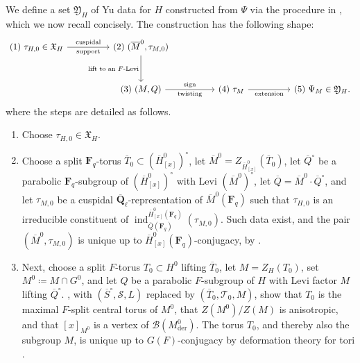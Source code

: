 \documentclass[reqno]{amsart}
\numberwithin{equation}{subsection}
\newcommand{\F}{\mathbf{F}}
\newcommand{\Q}{\mathbf{Q}}
\newcommand{\ol}[1]{\overline{#1}}
\newcommand\cB{\mathcal{B}}
\newcommand\cS{\mathcal{S}}
\newcommand\cT{\mathcal{T}}
\DeclareMathOperator{\ind}{ind}
\DeclareMathOperator{\der}{der}
\theoremstyle{remark}
\numberwithin{equation}{subsection}
\numberwithin{figure}{subsection}
\begin{document}
We define a set $\mathfrak Y_H$ of Yu data for $H$ constructed from $\Psi$ via the procedure in \cite[\S 9]{CF26a}, which we now recall concisely.
The construction has the following shape:
\[
\begin{tikzcd}[column sep=4.8em, row sep=3em]
\text{(1) }\tau_{H,0}\in\mathfrak X_H
\ar[r, "\text{cuspidal}", "\text{support}"'] &
\text{(2) }(\ol M^0,\tau_{M,0})
\ar[d, "\text{lift to an }F\text{-Levi}"'] \\
&
\text{(3) }(M,Q)
\ar[r, "\text{sign}", "\text{twisting}"'] &
\text{(4) }\tau_M
\ar[r, "\text{extension}"'] &
\text{(5) }\Psi_M\in\mathfrak Y_H .
\end{tikzcd}
\]
where the steps are detailed as follows.
\begin{enumerate}
\item Choose $\tau_{H,0} \in \mathfrak X_H$.
\item Choose a split $\F_q$-torus $\ol T_0 \subset (\ol H^0_{[x]})^\circ$, let $\ol M^0 = Z_{\ol H^0_{[x]}}(\ol T_0)$, let $\ol Q^\circ$ be a parabolic $\F_q$-subgroup of $(\ol H^0_{[x]})^\circ$ with Levi $(\ol M^0)^\circ$, let $\ol Q = \ol M^0 \cdot \ol Q^\circ$, and let $\tau_{M,0}$ be a cuspidal $\ol\Q_\ell$-representation of $\ol M^0(\F_q)$ such that $\tau_{H,0}$ is an irreducible constituent of $\ind_{\ol Q(\F_q)}^{\ol H^0_{[x]}(\F_q)}(\tau_{M,0})$. Such data exist, and the pair $(\ol M^0, \tau_{M,0})$ is unique up to $\ol H^0_{[x]}(\F_q)$-conjugacy, by \cite[Lemma~2.10.2]{Cot26b}.
\item Next, choose a split $F$-torus $T_0 \subset H^0$ lifting $\ol T_0$, let $M = Z_H(T_0)$, set $M^0\coloneqq M\cap G^0$, and let $Q$ be a parabolic $F$-subgroup of $H$ with Levi factor $M$ lifting $\ol Q^\circ$. \cite[Lemmas~9.1.1 and 9.1.2]{CF26a}, with $(\ol S^\circ,\cS,L)$ replaced by $(\ol T_0,\cT_0,M)$, show that $T_0$ is the maximal $F$-split central torus of $M^0$, that $Z(M^0)/Z(M)$ is anisotropic, and that $[x]_{M^0}$ is a vertex of $\cB(M^0_{\der})$. The torus $T_0$, and thereby also the subgroup $M$, is unique up to $G(F)$-conjugacy by deformation theory for tori \cite[Exp.\ IX, Corollaire 7.3]{SGA3II}.


\end{enumerate}
\end{document}
